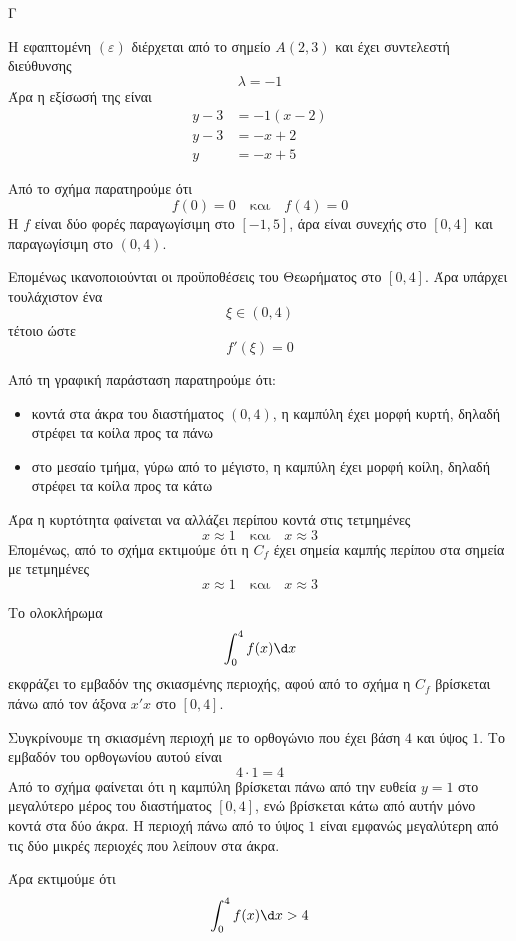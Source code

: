 \begin{thema}{Γ}
\begin{erwthma}
\item Η εφαπτομένη $(\varepsilon)$ διέρχεται από το σημείο $A(2,3)$ και έχει συντελεστή διεύθυνσης
\[
\lambda=-1
\]
Άρα η εξίσωσή της είναι
\begin{align*}
y-3&=-1(x-2)\\
y-3&=-x+2\\
y&=-x+5
\end{align*}

\item Από το σχήμα παρατηρούμε ότι
\[
f(0)=0
\quad \text{και}\quad
f(4)=0
\]
Η $f$ είναι δύο φορές παραγωγίσιμη στο $[-1,5]$, άρα είναι συνεχής στο $[0,4]$ και παραγωγίσιμη στο $(0,4)$.

Επομένως ικανοποιούνται οι προϋποθέσεις του Θεωρήματος  στο $[0,4]$.
Άρα υπάρχει τουλάχιστον ένα
\[
\xi\in(0,4)
\]
τέτοιο ώστε
\[
f'(\xi)=0
\]

\item Από τη γραφική παράσταση παρατηρούμε ότι:
\begin{itemize}
\item κοντά στα άκρα του διαστήματος $(0,4)$, η καμπύλη έχει μορφή κυρτή, δηλαδή στρέφει τα κοίλα προς τα πάνω
\item στο μεσαίο τμήμα, γύρω από το μέγιστο, η καμπύλη έχει μορφή κοίλη, δηλαδή στρέφει τα κοίλα προς τα κάτω
\end{itemize}
Άρα η κυρτότητα φαίνεται να αλλάζει περίπου κοντά στις τετμημένες
\[
x\approx 1
\quad \text{και}\quad
x\approx 3
\]
Επομένως, από το σχήμα εκτιμούμε ότι η $C_f$ έχει σημεία καμπής περίπου στα σημεία με τετμημένες
\[
x\approx 1
\quad \text{και}\quad
x\approx 3
\]

\item Το ολοκλήρωμα
\[
\dint_0^4 f(x)\d x
\]
εκφράζει το εμβαδόν της σκιασμένης περιοχής, αφού από το σχήμα η $C_f$ βρίσκεται πάνω από τον άξονα $x'x$ στο $[0,4]$.

Συγκρίνουμε τη σκιασμένη περιοχή με το ορθογώνιο που έχει βάση $4$ και ύψος $1$.
Το εμβαδόν του ορθογωνίου αυτού είναι
\[
4\cdot 1=4
\]
Από το σχήμα φαίνεται ότι η καμπύλη βρίσκεται πάνω από την ευθεία $y=1$ στο μεγαλύτερο μέρος του διαστήματος $[0,4]$, ενώ βρίσκεται κάτω από αυτήν μόνο κοντά στα δύο άκρα.
Η περιοχή πάνω από το ύψος $1$ είναι εμφανώς μεγαλύτερη από τις δύο μικρές περιοχές που λείπουν στα άκρα.

Άρα εκτιμούμε ότι
\[
\dint_0^4 f(x)\d x>4
\]
\end{erwthma}
\end{thema}


